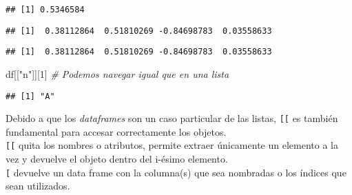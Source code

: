\documentclass[]{article}
\newenvironment{Shaded}{\begin{snugshade}}{\end{snugshade}}
\newcommand{\DecValTok}[1]{\textcolor[rgb]{0.00,0.00,0.81}{#1}}
\newcommand{\StringTok}[1]{\textcolor[rgb]{0.31,0.60,0.02}{#1}}
\newcommand{\CommentTok}[1]{\textcolor[rgb]{0.56,0.35,0.01}{\textit{#1}}}
\newcommand{\OperatorTok}[1]{\textcolor[rgb]{0.81,0.36,0.00}{\textbf{#1}}}
\newcommand{\NormalTok}[1]{#1}
\begin{document}
\begin{verbatim}
## [1] 0.5346584
\end{verbatim}

\begin{Shaded}
\end{Shaded}

\begin{verbatim}
## [1]  0.38112864  0.51810269 -0.84698783  0.03558633
\end{verbatim}

\begin{Shaded}
\end{Shaded}

\begin{verbatim}
## [1]  0.38112864  0.51810269 -0.84698783  0.03558633
\end{verbatim}

\begin{Shaded}
\begin{Highlighting}[]
\NormalTok{df[[}\StringTok{"n"}\NormalTok{]][}\DecValTok{1}\NormalTok{] }\CommentTok{# Podemos navegar igual que en una lista}
\end{Highlighting}
\end{Shaded}

\begin{verbatim}
## [1] "A"
\end{verbatim}

\begin{nota}
Debido a que los \textit{dataframes} son un caso particular de las listas,
\texttt{[[} es también fundamental para accesar correctamente los objetos.\\ 

\texttt{[[} quita los nombres o atributos, permite extraer
únicamente un elemento a la vez y devuelve el objeto dentro 
del i-ésimo elemento. \\

\texttt{[} devuelve un data frame con la columna(s) que sea nombradas o los índices
que sean utilizados.
\end{nota}
\end{document}
